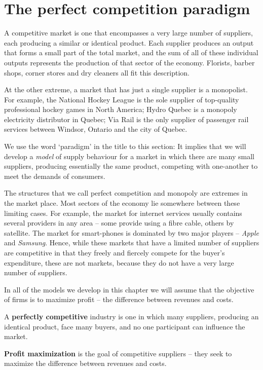 \section{The perfect competition paradigm}\label{sec:ch9sec1}

A competitive market is one that encompasses a very large number of
suppliers, each producing a similar or identical product. Each supplier
produces an output that forms a small part of the total market, and the sum
of all of these individual outputs represents the production of that sector
of the economy. Florists, barber shops, corner stores and dry cleaners all
fit this description.

At the other extreme, a market that has just a single supplier is a
monopolist. For example, the National Hockey League is the sole supplier of
top-quality professional hockey games in North America; Hydro Quebec is a
monopoly electricity distributor in Quebec; Via Rail is the only supplier of
passenger rail services between Windsor, Ontario and the city of Quebec.

We use the word `paradigm' in the title to this section: It implies that we
will develop a \textit{model} of supply behaviour for a market in which
there are many small suppliers, producing essentially the same product,
competing with one-another to meet the demands of consumers.

The structures that we call perfect competition and monopoly are extremes in
the market place. Most sectors of the economy lie somewhere between these
limiting cases. For example, the market for internet services usually
contains several providers in any area -- some provide using a fibre cable,
others by satellite. The market for smart-phones is dominated by two major
players -- \textit{Apple} and \textit{Samsung}. Hence, while these markets that have a limited
number of suppliers are competitive in that they freely and fiercely compete
for the buyer's expenditure, these are not 
markets, because they do not have a very large number of suppliers.

In all of the models we develop in this chapter we will assume that the
objective of firms is to maximize profit -- the difference between revenues
and costs.

\begin{DefBox}
	A \textbf{perfectly competitive} industry is one in which many suppliers, producing an identical product, face many buyers, and no one participant can influence the market.
	
	\textbf{Profit maximization} is the goal of competitive suppliers -- they seek to maximize the difference between revenues and costs.
\end{DefBox}

